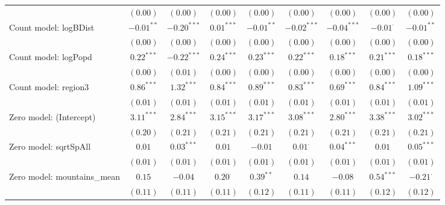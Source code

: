 \begin{sidewaystable}
\begin{center}
{\begin{tabular}{l c c c c c c c c}
                               & $(0.00)$      & $(0.00)$      & $(0.00)$       & $(0.00)$      & $(0.00)$       & $(0.00)$      & $(0.00)$        & $(0.00)$        \\
Count model: logBDist          & $-0.01^{**}$  & $-0.20^{***}$ & $0.01^{***}$   & $-0.01^{**}$  & $-0.02^{***}$  & $-0.04^{***}$ & $-0.01^{\cdot}$ & $-0.01^{**}$    \\
                               & $(0.00)$      & $(0.00)$      & $(0.00)$       & $(0.00)$      & $(0.00)$       & $(0.00)$      & $(0.00)$        & $(0.00)$        \\
Count model: logPopd           & $0.22^{***}$  & $-0.22^{***}$ & $0.24^{***}$   & $0.23^{***}$  & $0.22^{***}$   & $0.18^{***}$  & $0.21^{***}$    & $0.18^{***}$    \\
                               & $(0.00)$      & $(0.01)$      & $(0.00)$       & $(0.00)$      & $(0.00)$       & $(0.00)$      & $(0.00)$        & $(0.00)$        \\
Count model: region3           & $0.86^{***}$  & $1.32^{***}$  & $0.84^{***}$   & $0.89^{***}$  & $0.83^{***}$   & $0.69^{***}$  & $0.84^{***}$    & $1.09^{***}$    \\
                               & $(0.01)$      & $(0.01)$      & $(0.01)$       & $(0.01)$      & $(0.01)$       & $(0.01)$      & $(0.01)$        & $(0.01)$        \\
Zero model: (Intercept)        & $3.11^{***}$  & $2.84^{***}$  & $3.15^{***}$   & $3.17^{***}$  & $3.08^{***}$   & $2.80^{***}$  & $3.38^{***}$    & $3.02^{***}$    \\
                               & $(0.20)$      & $(0.21)$      & $(0.21)$       & $(0.21)$      & $(0.21)$       & $(0.21)$      & $(0.21)$        & $(0.21)$        \\
Zero model: sqrtSpAll          & $0.01$        & $0.03^{***}$  & $0.01$         & $-0.01$       & $0.01^{\cdot}$ & $0.04^{***}$  & $0.01$          & $0.05^{***}$    \\
                               & $(0.01)$      & $(0.01)$      & $(0.01)$       & $(0.01)$      & $(0.01)$       & $(0.01)$      & $(0.01)$        & $(0.01)$        \\
Zero model: mountains\_mean    & $0.15$        & $-0.04$       & $0.20^{\cdot}$ & $0.39^{**}$   & $0.14$         & $-0.08$       & $0.54^{***}$    & $-0.21^{\cdot}$ \\
                               & $(0.11)$      & $(0.11)$      & $(0.11)$       & $(0.12)$      & $(0.11)$       & $(0.11)$      & $(0.12)$        & $(0.12)$        \\

\end{tabular}}
\end{center}
\end{sidewaystable}
